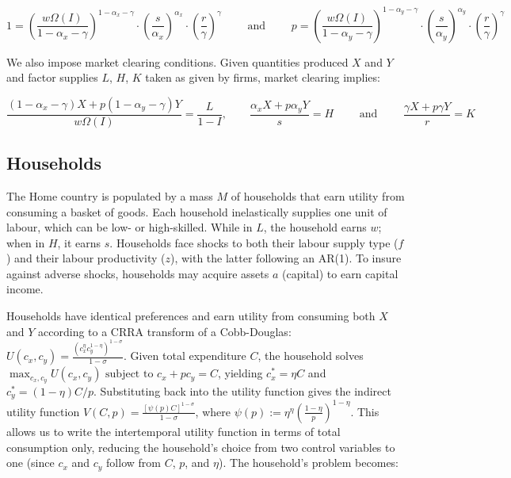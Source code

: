 \documentclass{article}
\begin{document}
\vspace{-0.2cm}
\begin{equation}
    1=\left(\frac{w\Omega(I)}{1-\alpha_x-\gamma}\right)^{1-\alpha_x-\gamma}\cdot \left(\frac{s}{\alpha_x}\right)^{\alpha_x}\cdot \left(\frac{r}{\gamma}\right)^\gamma \qquad \text{ and } \qquad p=\left(\frac{w\Omega(I)}{1-\alpha_y-\gamma}\right)^{1-\alpha_y-\gamma}\cdot \left(\frac{s}{\alpha_y}\right)^{\alpha_y}\cdot \left(\frac{r}{\gamma}\right)^\gamma \tag{ZP}
\end{equation}

We also impose market clearing conditions. Given quantities produced $X$ and $Y$ and factor supplies $L$, $H$, $K$ taken as given by firms, market clearing implies:

\begin{equation}
    \frac{(1-\alpha_x-\gamma) X + p (1-\alpha_y-\gamma) Y}{w\Omega(I)} = \frac{L}{1-I}, \qquad \frac{\alpha_x X + p \alpha_y Y}{s} = H \qquad \text{ and } \qquad  \frac{\gamma X + p \gamma Y}{r} = K \tag{MC}
\end{equation}


\vspace{-0.7cm}
\subsection{Households}

The Home country is populated by a mass $M$ of households that earn utility from consuming a basket of goods. Each household inelastically supplies one unit of labour, which can be low- or high-skilled. While in $L$, the household earns $w$; when in $H$, it earns $s$. Households face shocks to both their labour supply type ($f$) and their labour productivity ($z$), with the latter following an AR(1). To insure against adverse shocks, households may acquire assets $a$ (capital) to earn capital income.

Households have identical preferences and earn utility from consuming both $X$ and $Y$ according to a CRRA transform of a Cobb-Douglas: $U(c_x,c_y)=\frac{(c_x^\eta c_y^{1-\eta})^{1-\sigma}}{1-\sigma}$. Given total expenditure $C$, the household solves $\max_{c_x,c_y} U(c_x,c_y) \text{ subject to } c_x+pc_y=C$, yielding $c_x^*=\eta C$ and $c_y^*=(1-\eta)C/p$. Substituting back into the utility function gives the indirect utility function $V(C,p)=\frac{[\psi(p) C]^{1-\sigma}}{1-\sigma}$, where $\psi(p):=\eta^\eta \left(\frac{1-\eta}{p}\right)^{1-\eta}$. This allows us to write the intertemporal utility function in terms of total consumption only, reducing the household's choice from two control variables to one (since $c_x$ and $c_y$ follow from $C$, $p$, and $\eta$). The household's problem becomes:
\end{document}
